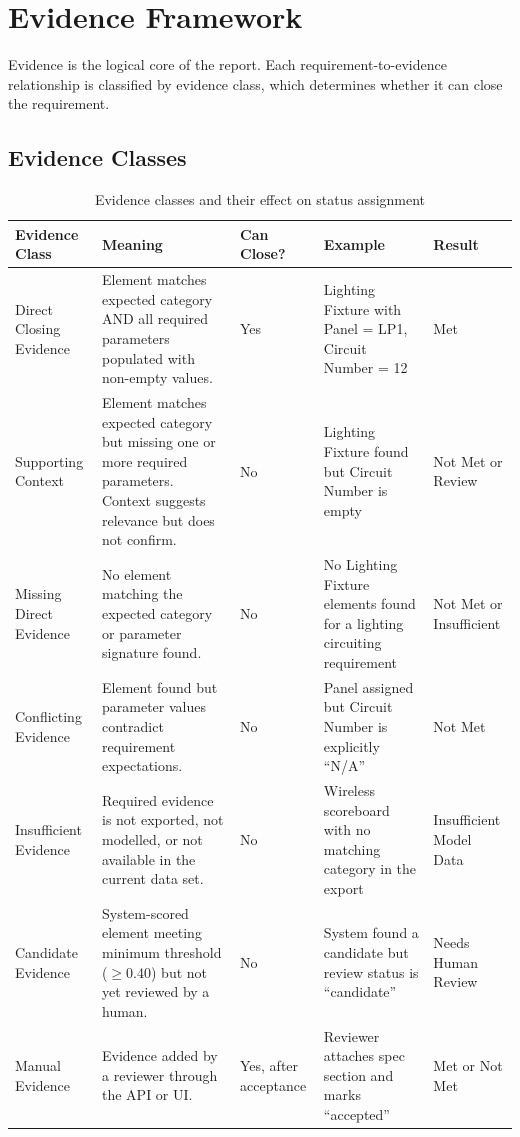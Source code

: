 \documentclass[10pt,letterpaper]{article}
\begin{document}
\section{Evidence Framework}

Evidence is the logical core of the report. Each requirement-to-evidence relationship is classified
by evidence class, which determines whether it can close the requirement.

\subsection{Evidence Classes}

\begin{longtable}{p{1.3in}p{1.5in}p{1.2in}p{1.4in}p{1.2in}}
\caption{Evidence classes and their effect on status assignment\label{tab:evidence-classes}}\\
\toprule
\textbf{Evidence Class} & \textbf{Meaning} & \textbf{Can Close?} & \textbf{Example} & \textbf{Result} \\
\midrule
\endhead
Direct Closing Evidence & Element matches expected category AND all required parameters populated
  with non-empty values. & Yes & Lighting Fixture with Panel = LP1,
  Circuit Number = 12 & Met \\
Supporting Context & Element matches expected category but missing one or more required parameters.
  Context suggests relevance but does not confirm. & No & Lighting Fixture found but Circuit Number
  is empty & Not Met or Review \\
Missing Direct Evidence & No element matching the expected category or parameter signature found.
  & No & No Lighting Fixture elements found for a lighting circuiting requirement
  & Not Met or Insufficient \\
Conflicting Evidence & Element found but parameter values contradict requirement expectations.
  & No & Panel assigned but Circuit Number is explicitly ``N/A'' & Not Met \\
Insufficient Evidence & Required evidence is not exported, not modelled, or not available in the
  current data set. & No & Wireless scoreboard with no matching category in the export
  & Insufficient Model Data \\
Candidate Evidence & System-scored element meeting minimum threshold ($\ge 0.40$) but not yet
  reviewed by a human. & No & System found a candidate but review status is
  ``candidate'' & Needs Human Review \\
Manual Evidence & Evidence added by a reviewer through the API or UI. & Yes, after acceptance
  & Reviewer attaches spec section and marks ``accepted'' & Met or Not Met \\
\bottomrule
\end{longtable}
\end{document}
